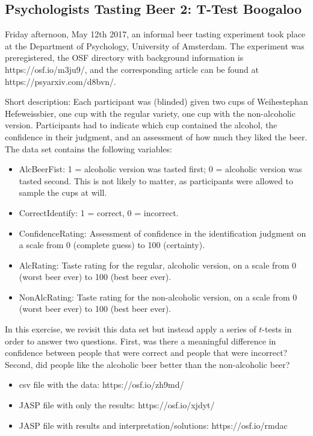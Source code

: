 \documentclass[
  letterpaper,
  DIV=11,
  numbers=noendperiod]{scrreprt}
\providecommand{\tightlist}{%
  \setlength{\itemsep}{0pt}\setlength{\parskip}{0pt}}\usepackage{longtable,booktabs,array}
\begin{document}
\hypertarget{psychologists-tasting-beer-2-t-test-boogaloo}{%
\subsection{Psychologists Tasting Beer 2: T-Test
Boogaloo}\label{psychologists-tasting-beer-2-t-test-boogaloo}}

Friday afternoon, May 12th 2017, an informal beer tasting experiment
took place at the Department of Psychology, University of Amsterdam. The
experiment was preregistered, the OSF directory with background
information is https://osf.io/m3ju9/, and the corresponding article can
be found at https://psyarxiv.com/d8bvn/.

Short description: Each participant was (blinded) given two cups of
Weihestephan Hefeweissbier, one cup with the regular variety, one cup
with the non-alcoholic version. Participants had to indicate which cup
contained the alcohol, the confidence in their judgment, and an
assessment of how much they liked the beer. The data set contains the
following variables:

\begin{itemize}
\tightlist
\item
  AlcBeerFist: 1 = alcoholic version was tasted first; 0 = alcoholic
  version was tasted second. This is not likely to matter, as
  participants were allowed to sample the cups at will.
\item
  CorrectIdentify: 1 = correct, 0 = incorrect.
\item
  ConfidenceRating: Assessment of confidence in the identification
  judgment on a scale from 0 (complete guess) to 100 (certainty).
\item
  AlcRating: Taste rating for the regular, alcoholic version, on a scale
  from 0 (worst beer ever) to 100 (best beer ever).
\item
  NonAlcRating: Taste rating for the non-alcoholic version, on a scale
  from 0 (worst beer ever) to 100 (best beer ever).
\end{itemize}

In this exercise, we revisit this data set but instead apply a series of
\(t\)-tests in order to answer two questions. First, was there a
meaningful difference in confidence between people that were correct and
people that were incorrect? Second, did people like the alcoholic beer
better than the non-alcoholic beer?

\begin{itemize}
\tightlist
\item
  csv file with the data: https://osf.io/zh9md/
\item
  JASP file with only the results: https://osf.io/xjdyt/
\item
  JASP file with results and interpretation/solutions:
  https://osf.io/rmdac
\end{itemize}
\end{document}
